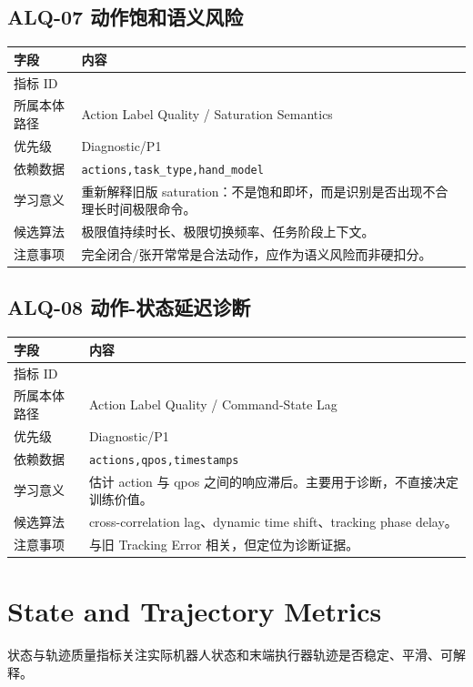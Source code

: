 \documentclass[UTF8,zihao=-4]{ctexart}
\newcommand{\Code}[1]{\texttt{#1}}
\newcommand{\MID}[1]{\texttt{\seqsplit{#1}}}
\begin{document}
\subsection{ALQ-07 动作饱和语义风险}

\begin{longtable}{L{3.6cm} L{9.6cm}}
\toprule
字段 & 内容 \\
\midrule
指标 ID & \MID{ALQ-07} \\
所属本体路径 & Action Label Quality / Saturation Semantics \\
优先级 & Diagnostic/P1 \\
依赖数据 & \Code{actions,task\_type,hand\_model} \\
学习意义 & 重新解释旧版 saturation：不是饱和即坏，而是识别是否出现不合理长时间极限命令。 \\
候选算法 & 极限值持续时长、极限切换频率、任务阶段上下文。 \\
注意事项 & 完全闭合/张开常常是合法动作，应作为语义风险而非硬扣分。 \\
\bottomrule
\end{longtable}

\subsection{ALQ-08 动作-状态延迟诊断}

\begin{longtable}{L{3.6cm} L{9.6cm}}
\toprule
字段 & 内容 \\
\midrule
指标 ID & \MID{ALQ-08} \\
所属本体路径 & Action Label Quality / Command-State Lag \\
优先级 & Diagnostic/P1 \\
依赖数据 & \Code{actions,qpos,timestamps} \\
学习意义 & 估计 action 与 qpos 之间的响应滞后。主要用于诊断，不直接决定训练价值。 \\
候选算法 & cross-correlation lag、dynamic time shift、tracking phase delay。 \\
注意事项 & 与旧 Tracking Error 相关，但定位为诊断证据。 \\
\bottomrule
\end{longtable}

\section{State and Trajectory Metrics}

状态与轨迹质量指标关注实际机器人状态和末端执行器轨迹是否稳定、平滑、可解释。
\end{document}
